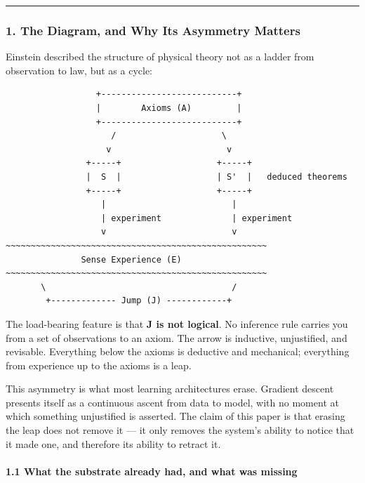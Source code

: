 \documentclass[
  11pt,
  a4paper,
]{article}
\begin{document}
\begin{center}\rule{0.5\linewidth}{0.5pt}\end{center}

\subsubsection{1. The Diagram, and Why Its Asymmetry
Matters}\label{the-diagram-and-why-its-asymmetry-matters}

Einstein described the structure of physical theory not as a ladder from
observation to law, but as a cycle:

\begin{verbatim}
                  +---------------------------+
                  |        Axioms (A)         |
                  +---------------------------+
                     /                     \
                    v                       v
                +-----+                   +-----+
                |  S  |                   | S'  |   deduced theorems
                +-----+                   +-----+
                   |                         |
                   | experiment              | experiment
                   v                         v
~~~~~~~~~~~~~~~~~~~~~~~~~~~~~~~~~~~~~~~~~~~~~~~~~~~~
               Sense Experience (E)
~~~~~~~~~~~~~~~~~~~~~~~~~~~~~~~~~~~~~~~~~~~~~~~~~~~~
       \                                     /
        +------------- Jump (J) ------------+
\end{verbatim}

The load-bearing feature is that \textbf{J is not logical}. No inference
rule carries you from a set of observations to an axiom. The arrow is
inductive, unjustified, and revisable. Everything below the axioms is
deductive and mechanical; everything from experience up to the axioms is
a leap.

This asymmetry is what most learning architectures erase. Gradient
descent presents itself as a continuous ascent from data to model, with
no moment at which something unjustified is asserted. The claim of this
paper is that erasing the leap does not remove it --- it only removes
the system's ability to notice that it made one, and therefore its
ability to retract it.

\paragraph{1.1 What the substrate already had, and what was
missing}\label{what-the-substrate-already-had-and-what-was-missing}
\end{document}
